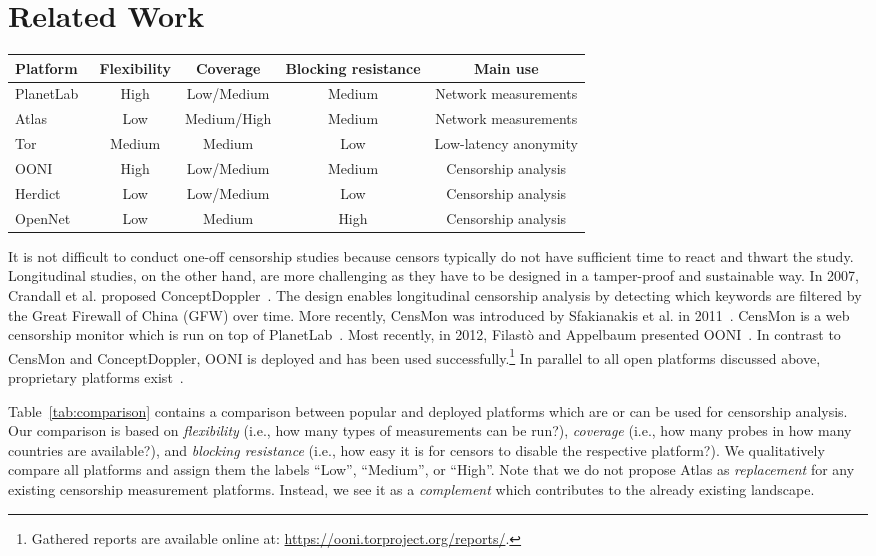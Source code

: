 \section{Related Work}
\label{related_work}
\begin{table*}[ht!]
\centering
\begin{tabular}{l|cccc}
\textbf{Platform} & \textbf{Flexibility} & \textbf{Coverage} &
\textbf{Blocking resistance} & \textbf{Main use} \\
\hline 
PlanetLab~\cite{planetlab} & High & Low/Medium & Medium & Network measurements \\
Atlas~\cite{atlas} & Low & Medium/High & Medium & Network measurements \\
Tor~\cite{Dingledine2004} & Medium & Medium & Low & Low-latency anonymity \\
OONI~\cite{Filasto2012} & High & Low/Medium & Medium & Censorship analysis \\
Herdict~\cite{Herdict} & Low & Low/Medium & Low & Censorship analysis \\
OpenNet~\cite{opennet} & Low & Medium & High & Censorship analysis \\
\hline 
\end{tabular} 
\caption{Comparison between several popular censorship analysis platforms.}
\label{tab:comparison}
\end{table*}

It is not difficult to conduct one-off censorship studies because censors
typically do not have sufficient time to react and thwart the study.
Longitudinal studies, on the other hand, are more challenging as they have to
be designed in a tamper-proof and sustainable way.  In 2007, Crandall et al.
proposed ConceptDoppler~\cite{Crandall2007}.  The design enables longitudinal
censorship analysis by detecting which keywords are filtered by the Great
Firewall of China (GFW) over time.  More recently, CensMon was introduced by
Sfakianakis et al. in 2011~\cite{Sfakianakis2011}.  CensMon is a web censorship
monitor which is run on top of PlanetLab~\cite{planetlab}.  Most recently, in
2012, Filast\`{o} and Appelbaum presented OONI~\cite{Filasto2012}.  In
contrast to CensMon and ConceptDoppler, OONI is deployed and has been used
successfully.\footnote{Gathered reports are available online at:
\url{https://ooni.torproject.org/reports/}.}  In parallel to all open platforms
discussed above, proprietary platforms exist~\cite{hwang2007herdict,opennet}.


Table~\ref{tab:comparison} contains a comparison between popular and deployed
platforms which are or can be used for censorship analysis.  Our comparison is
based on \emph{flexibility} (i.e., how many types of measurements can be run?),
\emph{coverage} (i.e., how many probes in how many countries are available?),
and \emph{blocking resistance} (i.e., how easy it is for censors to disable the
respective platform?).  We qualitatively compare all platforms and assign them
the labels ``Low'', ``Medium'', or ``High''.  Note that we do not propose
Atlas as \emph{replacement} for any existing censorship measurement platforms.
Instead, we see it as a \emph{complement} which contributes to the already
existing landscape.

